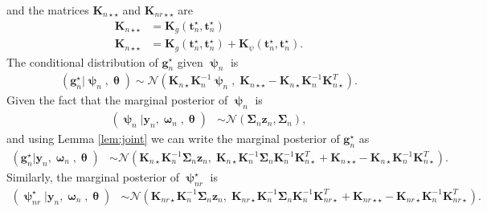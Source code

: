 \documentclass{article}
\newcommand{\pN}{\mathcal{N}}
\newcommand{\1}{\mathbf{1}}
\newcommand{\0}{\mathbf{0}}
\newcommand{\K}{\mathbf{K}}
\newcommand{\y}{\mathbf{y}}
\begin{document}
%
%
and the matrices $\K_{n\star\star}$ and $\K_{nr\star\star}$ are
%
%
\begin{align*}
	\K_{n\star\star} &= \K_g(\mathbf{t}_{n}^\star, \mathbf{t}_{n}^\star) \\
	\K_{n\star\star} &= \K_g(\mathbf{t}_{n}^\star, \mathbf{t}_{n}^\star) + \K_\psi(\mathbf{t}_{n}^\star, \mathbf{t}_{n}^\star). 
\end{align*}
%
%
%
The conditional distribution of $\mathbf{g}_n^\star$ given $\bm{\uppsi}_{n}$ is 
%
%
\begin{align*}
	(\mathbf{g}_{n}^\star | \bm{\uppsi}_{n} , \bm{\uptheta}) \sim \pN\left( \K_{n\star}\K_n^{-1}\bm{\uppsi}_{n},\; \K_{n\star\star} - \K_{n\star}\K_n^{-1}\K_{n\star}^T \right).
\end{align*}
%
%
%
Given the fact that the marginal posterior of $\bm{\uppsi}_{n}$ is
%
%
\begin{align*}
	(\bm{\uppsi}_{n} | \y_{n}, \bm{\upomega}_{n}, \bm{\uptheta})  &\sim \pN \left(\bm{\Sigma}_{n} \mathbf{z}_n, \bm{\Sigma}_{n}  \right),
\end{align*}
%
%
and using Lemma \ref{lem:joint} we can write the marginal posterior of $\mathbf{g}_n^\star$ as 
%
%
\begin{align*}
	(\mathbf{g}_n^\star | \y_{n}, \bm{\upomega}_{n}, \bm{\uptheta}) &\sim \pN \left( \K_{n\star}\K_n^{-1}\bm{\Sigma}_{n} \mathbf{z}_n,\; \K_{n\star}\K_n^{-1}\bm{\Sigma}_{n}\K_n^{-1} \K_{n\star}^T + \K_{n\star\star} - \K_{n\star}\K_n^{-1}\K_{n\star}^T \right).
\end{align*}
%
%
Similarly, the marginal posterior of $\bm{\uppsi}_{nr}^{\star}$ is 
%
%
\begin{align*}
	(\bm{\uppsi}_{nr}^{\star} | \y_{n}, \bm{\upomega}_{n}, \bm{\uptheta}) &\sim \pN \left( \K_{nr\star}\K_n^{-1}\bm{\Sigma}_{n} \mathbf{z}_n,\; \K_{nr\star}\K_n^{-1}\bm{\Sigma}_{n}\K_n^{-1} \K_{nr\star}^T + \K_{nr\star\star} - \K_{nr\star}\K_n^{-1}\K_{nr\star}^T \right).
\end{align*}
%
%
\end{document}
